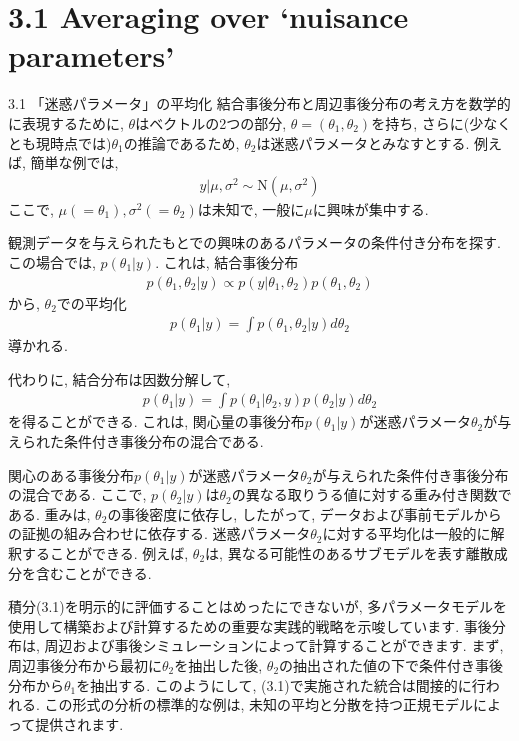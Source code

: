 \documentclass[10pt,dvipdfmx,a4]{beamer}
\newcommand{\eq}[1]{\begin{align}#1\end{align}}
\newcommand{\eqn}[1]{\begin{align*}#1\end{align*}}
\begin{document}
\section{3.1 Averaging over ‘nuisance parameters’}
\begin{frame}{3.1 「迷惑パラメータ」の平均化}
結合事後分布と周辺事後分布の考え方を数学的に表現するために, $\theta$はベクトルの2つの部分, $\theta=(\theta_1, \theta_2)$を持ち, さらに(少なくとも現時点では)$\theta_1$の推論であるため, $\theta_2$は迷惑パラメータとみなすとする.
例えば, 簡単な例では,
\eqn{y|\mu,\sigma^2 \sim \text{N}(\mu,\sigma^2)}
ここで, $\mu(=\theta_1), \sigma^2(=\theta_2)$は未知で, 一般に$\mu$に興味が集中する.

観測データを与えられたもとでの興味のあるパラメータの条件付き分布を探す.
この場合では, $p(\theta_1|y)$.
これは, 結合事後分布
\eqn{p(\theta_1,\theta_2|y)\propto p(y|\theta_1, \theta_2)p(\theta_1, \theta_2)}
から, $\theta_2$での平均化
\eqn{ p(\theta_1|y)=\int p(\theta_1,\theta_2|y)d\theta_2}
導かれる.
\end{frame}


\begin{frame}
代わりに, 結合分布は因数分解して,
\eq{p(\theta_1|y)=\int p(\theta_1|\theta_2, y)p(\theta_2|y)d\theta_2}
を得ることができる.
これは, 関心量の事後分布$p(\theta_1|y)$が迷惑パラメータ$\theta_2$が与えられた条件付き事後分布の混合である.

関心のある事後分布$p(\theta_1|y)$が迷惑パラメータ$\theta_2$が与えられた条件付き事後分布の混合である.
ここで, $p(\theta_2|y)$は$\theta_2$の異なる取りうる値に対する重み付き関数である.
重みは, $\theta_2$の事後密度に依存し, したがって, データおよび事前モデルからの証拠の組み合わせに依存する.
迷惑パラメータ$\theta_2$に対する平均化は一般的に解釈することができる.
例えば, $\theta_2$は, 異なる可能性のあるサブモデルを表す離散成分を含むことができる.

積分(3.1)を明示的に評価することはめったにできないが, 多パラメータモデルを使用して構築および計算するための重要な実践的戦略を示唆しています.
事後分布は, 周辺および事後シミュレーションによって計算することができます.
まず, 周辺事後分布から最初に$\theta_2$を抽出した後, $\theta_2$の抽出された値の下で条件付き事後分布から$\theta_1$を抽出する.
このようにして, (3.1)で実施された統合は間接的に行われる.
この形式の分析の標準的な例は, 未知の平均と分散を持つ正規モデルによって提供されます.
\end{frame}
\end{document}
